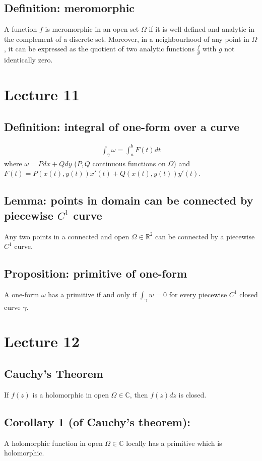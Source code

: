 \documentclass[11pt]{article}
\newcommand{\R}{\mathbb{R}}
\newcommand{\C}{\mathbb{C}}
\begin{document}
\subsection{Definition: meromorphic}
A function $f$ is meromorphic in an open set $\Omega$ if it is well-defined and analytic in the complement of a discrete set. Moreover, in a neighbourhood of any point in $\Omega$, it can be expressed as the quotient of two analytic functions $\frac{f}{g}$ with $g$ not identically zero.

\section{Lecture 11}

\subsection{Definition: integral of one-form over a curve}
\begin{align*}
    \int_\gamma \omega = \int_a^b F(t)dt 
\end{align*}
where $\omega = Pdx + Qdy$ ($P,Q$ continuous functions on $\Omega$) and $F(t) = P(x(t), y(t))x'(t) + Q(x(t), y(t))y'(t)$. 
\subsection{Lemma: points in domain can be connected by piecewise $C^1$ curve}
Any two points in a connected and open $\Omega \in \R^2$ can be connected by a piecewise $C^1$ curve. 

\subsection{Proposition: primitive of one-form}
A one-form $\omega$ has a primitive if and only if $\int_\gamma w = 0$ for every piecewise $C^1$ closed curve $\gamma$. 

\section{Lecture 12}

\subsection{Cauchy's Theorem}
If $f(z)$ is a holomorphic in open $\Omega \in \C$, then $f(z)dz$ is closed. 

\subsection{Corollary 1 (of Cauchy's theorem):}
A holomorphic function in open $\Omega \in \C$ locally has a primitive which is holomorphic. 
\end{document}
